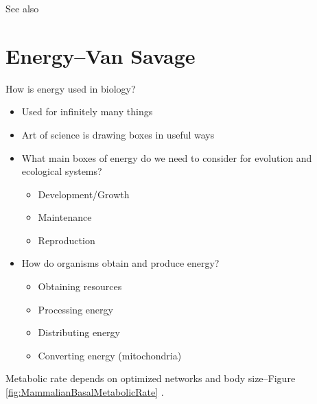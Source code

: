 \documentclass[]{article}
\begin{document}
See also \cite{marquet2005scaling}

\section[Energy]{Energy--Van Savage}

How is energy used in biology?

\begin{itemize}
	\item Used for infinitely many things
	\item Art of science is drawing boxes in useful ways
	\item What main boxes of energy do we need to consider for evolution and	ecological systems?
	\begin{itemize}
		\item Development/Growth
		\item Maintenance
		\item Reproduction
	\end{itemize}
	\item How do organisms obtain and produce energy?
	\begin{itemize}
		\item Obtaining resources
		\item Processing energy
		\item Distributing energy
		\item Converting energy (mitochondria)
	\end{itemize}
\end{itemize}

Metabolic rate depends on optimized networks and body size--Figure \ref {fig:MammalianBasalMetabolicRate} \cite{savage2004predominance}.
\end{document}
